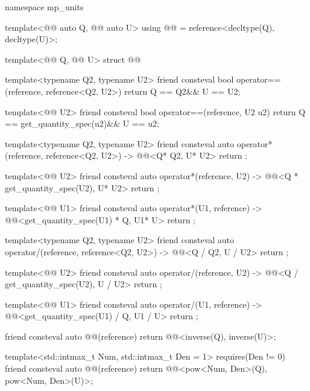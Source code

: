 \begin{codeblock}
namespace mp_units {

template<@@ auto Q, @@ auto U>
using @@ = reference<decltype(Q), decltype(U)>;

template<@@ Q, @@ U>
struct @@ {
  template<typename Q2, typename U2>
  friend consteval bool operator==(reference, reference<Q2, U2>)
  {
    return Q{} == Q2{}&& U{} == U2{};
  }

  template<@@ U2>
  friend consteval bool operator==(reference, U2 u2)
  {
    return Q{} == get_quantity_spec(u2)&& U{} == u2;
  }

  template<typename Q2, typename U2>
  friend consteval auto operator*(reference, reference<Q2, U2>)
    -> @@<Q{}* Q2{}, U{}* U2{}>
  {
    return {};
  }

  template<@@ U2>
  friend consteval auto operator*(reference, U2)
    -> @@<Q{} * get_quantity_spec(U2{}), U{}* U2{}>
  {
    return {};
  }

  template<@@ U1>
  friend consteval auto operator*(U1, reference)
    -> @@<get_quantity_spec(U1{}) * Q{}, U1{}* U{}>
  {
    return {};
  }

  template<typename Q2, typename U2>
  friend consteval auto operator/(reference, reference<Q2, U2>)
    -> @@<Q{} / Q2{}, U{} / U2{}>
  {
    return {};
  }

  template<@@ U2>
  friend consteval auto operator/(reference, U2)
    -> @@<Q{} / get_quantity_spec(U2{}), U{} / U2{}>
  {
    return {};
  }

  template<@@ U1>
  friend consteval auto operator/(U1, reference)
    -> @@<get_quantity_spec(U1{}) / Q{}, U1{} / U{}>
  {
    return {};
  }

  friend consteval auto @@(reference) { return @@<inverse(Q{}), inverse(U{})>{}; }

  template<std::intmax_t Num, std::intmax_t Den = 1>
    requires(Den != 0)
  friend consteval auto @@(reference)
  {
    return @@<pow<Num, Den>(Q{}), pow<Num, Den>(U{})>{};
  }

}}
\end{codeblock}
